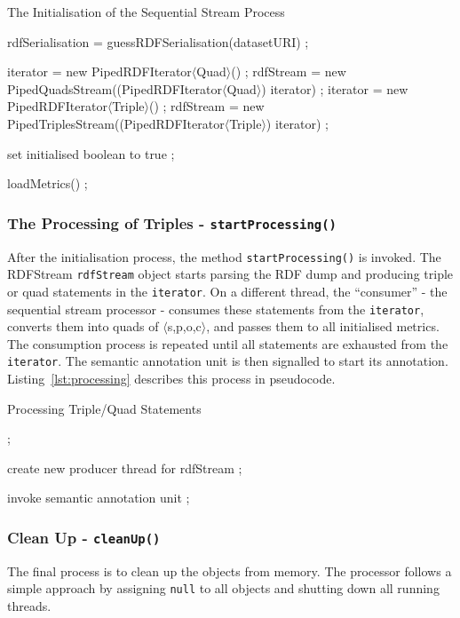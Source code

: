 \begin{algorithm}
\caption{The Initialisation of the Sequential Stream Process}
\label{lst:setUp}
\begin{algorithmic}[1]
\State rdfSerialisation = guessRDFSerialisation(datasetURI) ;

\State iterator = new PipedRDFIterator$\langle$Quad$\rangle$() ;
\State rdfStream = new PipedQuadsStream((PipedRDFIterator$\langle$Quad$\rangle$) iterator) ;
\EndIf
{} 
\State iterator = new PipedRDFIterator$\langle$Triple$\rangle$() ;
\State rdfStream = new PipedTriplesStream((PipedRDFIterator$\langle$Triple$\rangle$) iterator) ;
\EndIf

\State set initialised boolean to true ;

\State loadMetrics() ;
\EndProcedure
\end{algorithmic}
\end{algorithm}

\subsubsection{The Processing of Triples - \texttt{startProcessing()}}
After the initialisation process, the method \texttt{startProcessing()} is invoked.
The RDFStream \texttt{rdfStream} object starts parsing the RDF dump and producing triple or quad statements in the \texttt{iterator}.
On a different thread, the ``consumer'' - the sequential stream processor - consumes these statements from the \texttt{iterator}, converts them into quads of $\langle$s,p,o,c$\rangle$, and passes them to all initialised metrics.
The consumption process is repeated until all statements are exhausted from the \texttt{iterator}.
The semantic annotation unit is then signalled to start its annotation.
Listing~\ref{lst:processing} describes this process in pseudocode.

\begin{algorithm}
\caption{Processing Triple/Quad Statements}
\label{lst:processing}
\begin{algorithmic}[1]
  ; \EndIf

\State create new producer thread for rdfStream ;

\EndWhile

\State invoke semantic annotation unit ;
\EndProcedure
\end{algorithmic}
\end{algorithm}

\subsubsection{Clean Up - \texttt{cleanUp()}}
The final process is to clean up the objects from memory.
The processor follows a simple approach by assigning \texttt{null} to all objects and shutting down all running threads.

